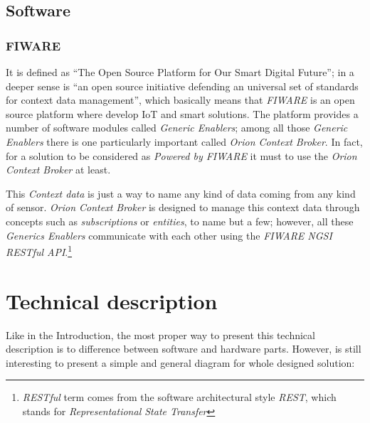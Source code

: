 \documentclass[11pt,a4paper,dvipsnames,twoside]{article}
\begin{document}
\subsection{Software}

\subsubsection{FIWARE}
It is defined as \enquote{The Open Source Platform for Our Smart Digital Future}\cite{Fiware}; in a deeper sense is \enquote{an open source initiative defending an universal set of standards for context data management}\cite{Fiware}, which basically means that \textit{FIWARE} is an open source platform where develop IoT and smart solutions. The platform provides a number of software modules called \textit{Generic Enablers}; among all those \textit{Generic Enablers} there is one particularly important called \textit{Orion Context Broker}. In fact, for a solution to be considered as \textit{Powered by FIWARE} it must to use the \textit{Orion Context Broker} at least. 

This \textit{Context data} is just a way to name any kind of data coming from any kind of sensor. \textit{Orion Context Broker} is designed to manage this context data through concepts such as \textit{subscriptions} or \textit{entities}, to name but a few; however, all these \textit{Generics Enablers} communicate with each other using the \textit{FIWARE NGSI RESTful API}\cite{NGSI}.\footnote{\textit{RESTful} term comes from the software architectural style \textit{REST}, which stands for \textit{Representational State Transfer}}

\newpage
\section{Technical description}
Like in the Introduction, the most proper way to present this technical description is to difference between software and hardware parts. However, is still interesting to present a simple and general diagram for whole designed solution:
\end{document}
